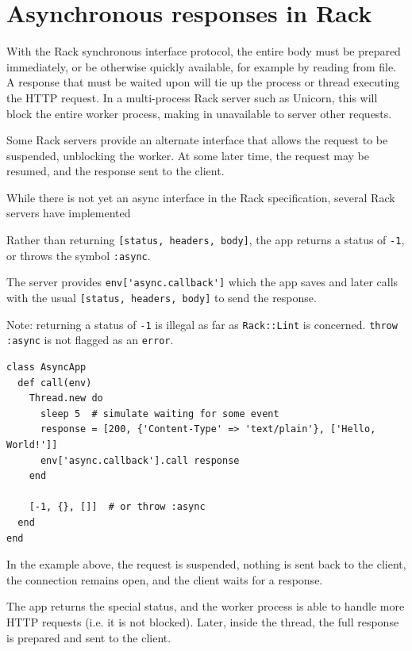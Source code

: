 \section{Asynchronous responses in Rack}


With the Rack  synchronous interface protocol, the entire body must
be prepared immediately, or be otherwise quickly available, for
example by reading from file. A response that must be waited upon
will tie up the process or thread executing the HTTP request. In a
multi-process Rack server such as Unicorn, this will block the
entire worker process, making in unavailable to server other requests.

Some Rack servers provide an alternate interface that allows the
request to be suspended, unblocking the worker. At some later time,
the request may be resumed, and the response sent to the client.

While there is not yet an async interface in the Rack specification,
several Rack servers have implemented 


Rather than returning \verb|[status, headers, body]|, the app returns a
status of \verb|-1|, or throws the symbol \verb|:async|. 

The server provides
\verb|env['async.callback']| 
which the app saves and later calls with the
usual \verb|[status, headers, body]| 
to send the response.

Note: returning a status of \verb|-1| is illegal as far as \verb|Rack::Lint| is
concerned. \verb|throw :async| is not flagged as an \verb|error|.
\begin{verbatim}
class AsyncApp
  def call(env)
    Thread.new do
      sleep 5  # simulate waiting for some event
      response = [200, {'Content-Type' => 'text/plain'}, ['Hello, World!']]
      env['async.callback'].call response
    end
    
    [-1, {}, []]  # or throw :async
  end
end
\end{verbatim}

In the example above, the request is suspended, nothing is sent
back to the client, the connection remains open, and the client
waits for a response. 

The app returns the special status, and the
worker process is able to handle more HTTP requests (i.e. it is not
blocked). Later, inside the thread, the full response is prepared
and sent to the client.

